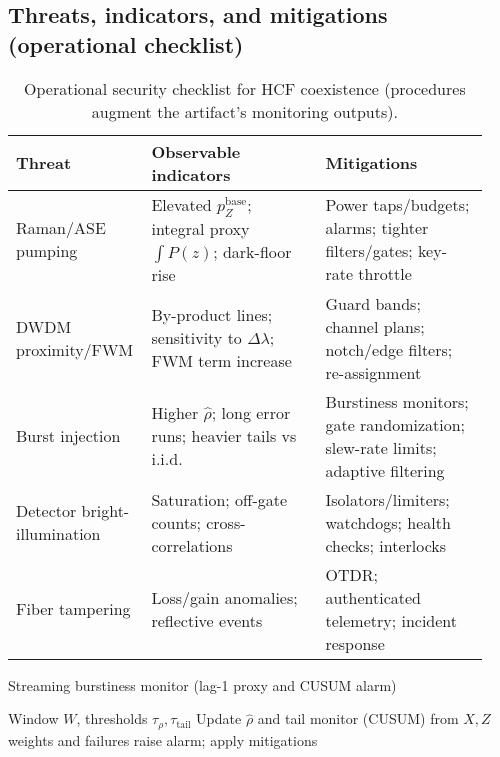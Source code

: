 \documentclass{article}
\begin{document}
\subsection{Threats, indicators, and mitigations (operational checklist)}
\begin{table}[ht]
\small
\centering
\caption{Operational security checklist for HCF coexistence (procedures augment the artifact’s monitoring outputs).}
\label{tab:threat-mitigation}
\begin{adjustbox}{width=\linewidth}
\begin{tabular}{p{0.24\linewidth} p{0.36\linewidth} p{0.34\linewidth}}
\toprule
Threat & Observable indicators & Mitigations \\
\midrule
Raman/ASE pumping & Elevated \(p_Z^{\text{base}}\); integral proxy \(\int P(z)\); dark-floor rise & Power taps/budgets; alarms; tighter filters/gates; key-rate throttle \\
DWDM proximity/FWM & By-product lines; sensitivity to \(\Delta\lambda\); FWM term increase & Guard bands; channel plans; notch/edge filters; re-assignment \\
Burst injection & Higher \(\widehat{\rho}\); long error runs; heavier tails vs i.i.d. & Burstiness monitors; gate randomization; slew-rate limits; adaptive filtering \\
Detector bright-illumination & Saturation; off-gate counts; cross-correlations & Isolators/limiters; watchdogs; health checks; interlocks \\
Fiber tampering & Loss/gain anomalies; reflective events & OTDR; authenticated telemetry; incident response \\
\bottomrule
\end{tabular}
\end{adjustbox}
\vspace{0.5em}
\end{table}

\begin{algorithm}[ht]
\small
\caption{Streaming burstiness monitor (lag-1 proxy and CUSUM alarm)}\label{alg:burst}
\begin{algorithmic}[1]
\Require Window \(W\), thresholds \(\tau_\rho,\tau_{\mathrm{tail}}\)
  \State Update \(\widehat{\rho}\) and tail monitor (CUSUM) from \(X,Z\) weights and failures
   raise alarm; apply mitigations
  \EndIf
\EndFor
\end{algorithmic}
\end{algorithm}
\end{document}

